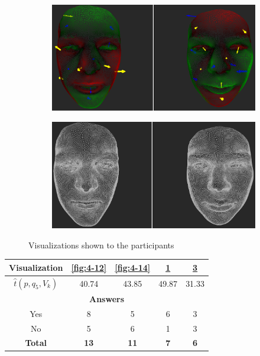 \begin{figure}[h]
\begin{subfigure}{0.4\textwidth}
\includegraphics[width=\textwidth]{./screenshots/pair11.PNG}
\caption{}
\label{fig:4-11}
\end{subfigure}
\quad
\begin{subfigure}{0.4\textwidth}
\includegraphics[width=\textwidth]{./screenshots/pair13.PNG}
\caption{}
\label{fig:4-13}
\end{subfigure}
\caption{Visualizations shown to the participants}
\end{figure}
\medskip

\begin{center}
\begin{tabular}{| c | c | c | c | c |}
	\hline
	Visualization & \ref{fig:4-12} & \ref{fig:4-14} & \ref{fig:4-11} & \ref{fig:4-13}\\ \hline
	\(\widehat{t}(p, q_5, V_k)\) & 40.74 & 43.85 & 49.87 & 31.33\\ \hline
	\multicolumn{5}{|c|}{\bf Answers} \\ \hline
	Yes & 8 & 5 & 6 & 3\\ \hline
	No & 5 & 6 & 1 & 3\\ \hline
	{\bf Total} & {\bf 13} & {\bf 11} & {\bf 7} & {\bf 6}\\ \hline
\end{tabular}
\end{center}
\clearpage

